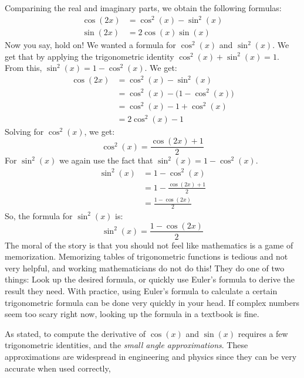 \documentclass{article}
\theoremstyle{normal}
\theoremstyle{plain}
\begin{document}
    Comparining the real and imaginary parts, we obtain the following formulas:
    \begin{align}
        \cos(2x)&=\cos^{2}(x)-\sin^{2}(x)\\
        \sin(2x)&=2\cos(x)\sin(x)
    \end{align}
    Now you say, hold on! We wanted a formula for $\cos^{2}(x)$ and
    $\sin^{2}(x)$. We get that by applying the trigonometric identity
    $\cos^{2}(x)+\sin^{2}(x)=1$. From this, $\sin^{2}(x)=1-\cos^{2}(x)$. We get:
    \begin{align}
        \cos(2x)&=\cos^{2}(x)-\sin^{2}(x)\\
            &=\cos^{2}(x)-\big(1-\cos^{2}(x)\big)\\
            &=\cos^{2}(x)-1+\cos^{2}(x)\\
            &=2\cos^{2}(x)-1
    \end{align}
    Solving for $\cos^{2}(x)$, we get:
    \begin{equation}
        \cos^{2}(x)=\frac{\cos(2x)+1}{2}
    \end{equation}
    For $\sin^{2}(x)$ we again use the fact that $\sin^{2}(x)=1-\cos^{2}(x)$.
    \begin{align}
        \sin^{2}(x)&=1-\cos^{2}(x)\\
            &=1-\frac{\cos(2x)+1}{2}\\
            &=\frac{1-\cos(2x)}{2}
    \end{align}
    So, the formula for $\sin^{2}(x)$ is:
    \begin{equation}
        \sin^{2}(x)=\frac{1-\cos(2x)}{2}
    \end{equation}
    The moral of the story is that you should not feel like mathematics is a
    game of memorization. Memorizing tables of trigonometric functions is
    tedious and not very helpful, and working mathematicians do not do this!
    They do one of two things: Look up the desired formula, or quickly use
    Euler's formula to derive the result they need. With practice, using
    Euler's formula to calculate a certain trigonometric formula can be done
    very quickly in your head. If complex numbers seem too scary right now,
    looking up the formula in a textbook is fine.
    \par\hfill\par
    As stated, to compute the derivative of $\cos(x)$ and $\sin(x)$ requires
    a few trigonometric identities, and the
    \textit{small angle approximations}. These approximations are widespread in
    engineering and physics since they can be very accurate when used correctly,
\end{document}
